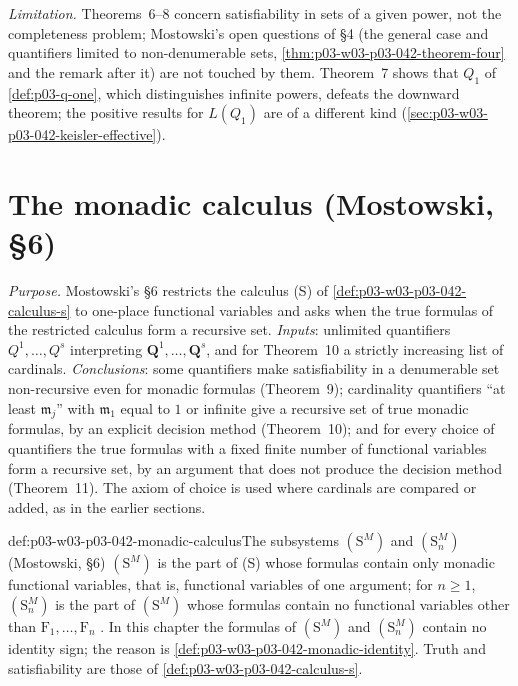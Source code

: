 \emph{Limitation.}  Theorems~6--8 concern satisfiability in sets of a
given power, not the completeness problem; Mostowski's open questions of
\S4 (the general case and quantifiers limited to non-denumerable sets,
\cref{thm:p03-w03-p03-042-theorem-four} and the remark after it) are not
touched by them.  Theorem~7 shows that \(Q_1\) of
\cref{def:p03-q-one}, which distinguishes infinite powers, defeats the
downward theorem; the positive results for \(L(Q_1)\) are of a different
kind (\cref{sec:p03-w03-p03-042-keisler-effective}).


\section{The monadic calculus (Mostowski, \S6)}
\label{sec:p03-w03-p03-042-monadic}

\emph{Purpose.}  Mostowski's \S6 restricts the calculus (S) of
\cref{def:p03-w03-p03-042-calculus-s} to one-place functional variables
and asks when the true formulas of the restricted calculus form a
recursive set.  \emph{Inputs}: unlimited quantifiers \(Q^1,\ldots,Q^s\)
interpreting \(\mathbf Q^1,\ldots,\mathbf Q^s\), and for Theorem~10 a
strictly increasing list of cardinals.  \emph{Conclusions}: some
quantifiers make satisfiability in a denumerable set non-recursive even
for monadic formulas (Theorem~9); cardinality quantifiers ``at least
\(\mathfrak m_j\)'' with \(\mathfrak m_1\) equal to \(1\) or infinite give
a recursive set of true monadic formulas, by an explicit decision method
(Theorem~10); and for every choice of quantifiers the true formulas with a
fixed finite number of functional variables form a recursive set, by an
argument that does not produce the decision method (Theorem~11).  The
axiom of choice is used where cardinals are compared or added, as in the
earlier sections.

\begin{hbdefinition}{def:p03-w03-p03-042-monadic-calculus}{The subsystems \((\mathrm S^M)\) and \((\mathrm S^M_n)\) (Mostowski, \S6)}
\((\mathrm S^M)\) is the part of (S) whose formulas contain only monadic
functional variables, that is, functional variables of one argument; for
\(n\geq1\), \((\mathrm S^M_n)\) is the part of \((\mathrm S^M)\) whose
formulas contain no functional variables other than \(\mathrm
F_1,\ldots,\mathrm F_n\) \cite[p.~28]{Mostowski1957}.  In this chapter the
formulas of \((\mathrm S^M)\) and \((\mathrm S^M_n)\) contain no identity
sign; the reason is \cref{def:p03-w03-p03-042-monadic-identity}.  Truth
and satisfiability are those of \cref{def:p03-w03-p03-042-calculus-s}.
\end{hbdefinition}


